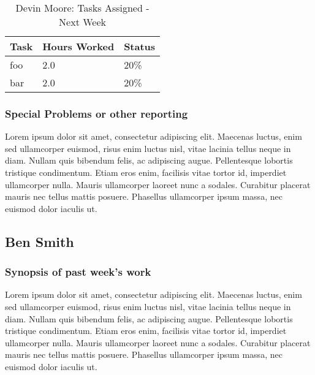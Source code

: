 \documentclass[12pt,journal,compsoc]{IEEEtran}
\begin{document}
\begin{table}[ht]
\renewcommand{\arraystretch}{1.3}
	\caption{Devin Moore: Tasks Assigned - Next Week}
	
	\label{Summary of Devin Moore's activites: this week}
	
	\centering
	
	\begin{tabular}{p{5.5cm}|p{1cm}|p{1cm}}

	\hline
	\bfseries 	Task		 		& \bfseries Hours Worked	& \bfseries Status	\\
	\hline
	\hline
				foo					& 2.0						& 20\%				\\	%
				bar					& 2.0						& 20\%				\\	
	\hline
	\end{tabular}
\end{table}

\subsubsection*{Special Problems or other reporting}
Lorem ipsum dolor sit amet, consectetur adipiscing elit. Maecenas luctus, enim sed ullamcorper euismod, risus enim luctus nisl, vitae lacinia tellus neque in diam. Nullam quis bibendum felis, ac adipiscing augue. Pellentesque lobortis tristique condimentum. Etiam eros enim, facilisis vitae tortor id, imperdiet ullamcorper nulla. Mauris ullamcorper laoreet nunc a sodales. Curabitur placerat mauris nec tellus mattis posuere. Phasellus ullamcorper ipsum massa, nec euismod dolor iaculis ut.

\subsection{Ben Smith}

\subsubsection*{Synopsis of past week's work}

Lorem ipsum dolor sit amet, consectetur adipiscing elit. Maecenas luctus, enim sed ullamcorper euismod, risus enim luctus nisl, vitae lacinia tellus neque in diam. Nullam quis bibendum felis, ac adipiscing augue. Pellentesque lobortis tristique condimentum. Etiam eros enim, facilisis vitae tortor id, imperdiet ullamcorper nulla. Mauris ullamcorper laoreet nunc a sodales. Curabitur placerat mauris nec tellus mattis posuere. Phasellus ullamcorper ipsum massa, nec euismod dolor iaculis ut.
\end{document}
